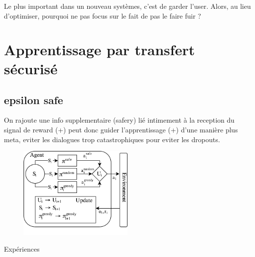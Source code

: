\documentclass[french]{beamer}
\begin{document}
    \subsection{}

    \begin{frame}
        Le plus important dans un nouveau systèmes, c'est de garder l'user. Alors, au lieu d'optimiser, pourquoi ne pas focus sur le fait de pas le faire fuir ?
    \end{frame}

    \section{Apprentissage par transfert sécurisé}

    \subsection{epsilon safe}

    \begin{frame}
        On rajoute une info supplementaire (safery) lié intimement à la reception du signal de reward
        (+) peut donc guider l'apprentissage
        (+) d'une manière plus meta, eviter les dialogues trop catastrophiques pour eviter les dropouts.

    \end{frame}

    \begin{frame}

        \begin{figure}
            \begin{center}
                \includegraphics[width=0.5\textwidth]{img/transfer7.pdf}
            \end{center}
        \end{figure}

    \end{frame}

    \begin{frame}{Expériences}


    \end{frame}
\end{document}
